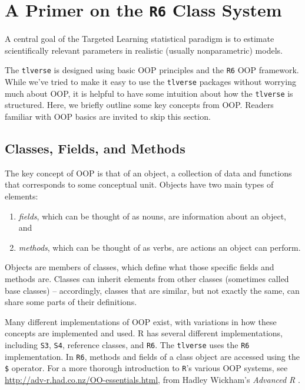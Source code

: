 \documentclass[12pt, krantz2,]{krantz}
\providecommand{\tightlist}{%
  \setlength{\itemsep}{0pt}\setlength{\parskip}{0pt}}
\theoremstyle{definition}
\theoremstyle{definition}
\theoremstyle{definition}
\newcommand{\1}{\mathbbm{1}}
\begin{document}
\hypertarget{r6}{%
\section{\texorpdfstring{A Primer on the \texttt{R6} Class System}{A Primer on the R6 Class System}}\label{r6}}

A central goal of the Targeted Learning statistical paradigm is to estimate
scientifically relevant parameters in realistic (usually nonparametric) models.

The \texttt{tlverse} is designed using basic OOP principles and the \texttt{R6} OOP framework.
While we've tried to make it easy to use the \texttt{tlverse} packages without worrying
much about OOP, it is helpful to have some intuition about how the \texttt{tlverse} is
structured. Here, we briefly outline some key concepts from OOP. Readers
familiar with OOP basics are invited to skip this section.

\hypertarget{classes-fields-and-methods}{%
\subsection{Classes, Fields, and Methods}\label{classes-fields-and-methods}}

The key concept of OOP is that of an object, a collection of data and functions
that corresponds to some conceptual unit. Objects have two main types of
elements:

\begin{enumerate}
\def\labelenumi{\arabic{enumi}.}
\tightlist
\item
  \emph{fields}, which can be thought of as nouns, are information about an object,
  and
\item
  \emph{methods}, which can be thought of as verbs, are actions an object can
  perform.
\end{enumerate}

Objects are members of classes, which define what those specific fields and
methods are. Classes can inherit elements from other classes (sometimes called
base classes) -- accordingly, classes that are similar, but not exactly the
same, can share some parts of their definitions.

Many different implementations of OOP exist, with variations in how these
concepts are implemented and used. R has several different implementations,
including \texttt{S3}, \texttt{S4}, reference classes, and \texttt{R6}. The \texttt{tlverse} uses the \texttt{R6}
implementation. In \texttt{R6}, methods and fields of a class object are accessed using
the \texttt{\$} operator. For a more thorough introduction to \texttt{R}'s various OOP systems,
see \url{http://adv-r.had.co.nz/OO-essentials.html}, from Hadley Wickham's \emph{Advanced
R} \citep{wickham2014advanced}.
\end{document}
